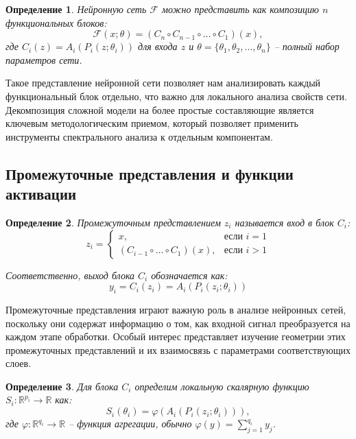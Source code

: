 \documentclass[a4paper,12pt]{article}
\newtheorem{definition}{Определение}
\begin{document}
\begin{definition}
  Нейронную сеть $\mathcal{F}$ можно представить как композицию $n$ функциональных блоков:
  \begin{equation}
    \mathcal{F}(x; \theta) = (C_n \circ C_{n-1} \circ \ldots \circ C_1)(x),
  \end{equation}
  где $C_i(z) = A_i(P_i(z; \theta_i))$ для входа $z$ и $\theta = \{\theta_1, \theta_2, \ldots, \theta_n\}$ --
  полный набор параметров сети.
\end{definition}

Такое представление нейронной сети позволяет нам анализировать каждый функциональный блок отдельно, что важно
для локального анализа свойств сети. Декомпозиция сложной модели на более простые составляющие является
ключевым методологическим приемом, который позволяет применить инструменты спектрального анализа к отдельным
компонентам.

\subsection{Промежуточные представления и функции активации}

\begin{definition}
  Промежуточным представлением $z_i$ называется вход в блок $C_i$:
  \begin{equation}
    z_i =
    \begin{cases}
      x, & \text{если } i = 1 \\
      (C_{i-1} \circ \ldots \circ C_1)(x), & \text{если } i > 1
    \end{cases}
  \end{equation}

  Соответственно, выход блока $C_i$ обозначается как:
  \begin{equation}
    y_i = C_i(z_i) = A_i(P_i(z_i; \theta_i))
  \end{equation}
\end{definition}

Промежуточные представления играют важную роль в анализе нейронных сетей, поскольку они содержат информацию о
том, как входной сигнал преобразуется на каждом этапе обработки. Особый интерес представляет изучение
геометрии этих промежуточных представлений и их взаимосвязь с параметрами соответствующих слоев.

\begin{definition}
  Для блока $C_i$ определим локальную скалярную функцию $S_i: \mathbb{R}^{p_i} \rightarrow \mathbb{R}$ как:
  \begin{equation}
    S_i(\theta_i) = \varphi(A_i(P_i(z_i; \theta_i))),
  \end{equation}
  где $\varphi: \mathbb{R}^{q_i} \rightarrow \mathbb{R}$ -- функция агрегации, обычно $\varphi(y) =
  \sum_{j=1}^{q_i} y_j$.
\end{definition}
\end{document}
